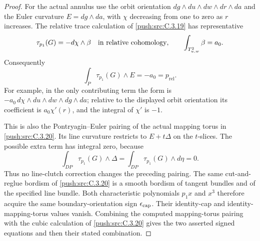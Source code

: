 \begin{proof}
For the actual annulus use the orbit orientation
$dg\wedge du\wedge dw\wedge dr\wedge da$ and the
Euler curvature $E=dg\wedge da$, with $\chi$ decreasing
from one to zero as $r$ increases. The relative trace
calculation of \ref{push:src:C.3.19} has representative
\[
 \tau_{p_1}(G)
 =-d\chi\wedge\beta
 \quad\hbox{in relative cohomology},
 \qquad
 \int_{T^2_{u,w}}\beta=a_0.
\]
Consequently
\[
 \int_P\tau_{p_1}(G)\wedge E=-a_0=p_{\mathrm{rel}}.
\]
For example, in the only contributing term the form is
$-a_0\,d\chi\wedge du\wedge dw\wedge dg\wedge da$;
relative to the displayed orbit orientation its coefficient
is $a_0\chi'(r)$, and the integral of $\chi'$ is $-1$.

This is also the Pontryagin--Euler pairing of the actual
mapping torus in \ref{push:src:C.3.20}. Its line curvature restricts to
$E+t\Delta$ on the $t$-slices. The possible extra term
has integral zero, because
\[
 \int_{DP}\tau_{p_1}(G)\wedge\Delta
 =\int_{DP}\tau_{p_1}(G)\wedge d\eta=0.
\]
Thus no line-clutch correction changes the preceding
pairing. The same cut-and-reglue bordism of \ref{push:src:C.3.20} is a
smooth bordism of tangent bundles and of the specified
line bundle. Both characteristic polynomials $p_1x$
and $x^3$ therefore acquire the same boundary-orientation
sign $\epsilon_{\rm cap}$. Their identity-cap and
identity-mapping-torus values vanish. Combining the
computed mapping-torus pairing with the cubic calculation
of \ref{push:src:C.3.20} gives the two asserted signed equations and
then their stated combination.
\end{proof}
